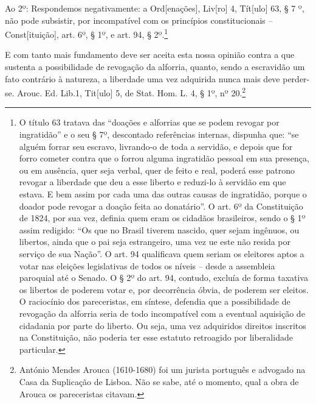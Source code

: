 Ao 2º: Respondemos negativamente: a Ord{[}enações{]}, Liv{[}ro{]} 4,
Tít{[}ulo{]} 63, § 7 º, não pode subsistir, por incompatível com os
princípios constitucionais -- Const{[}ituição{]}, art. 6º, § 1º, e art.
94, § 2º.\footnote{O título 63 tratava das ``doações e alforrias que se
  podem revogar por ingratidão'' e o seu § 7º, descontado referências
  internas, dispunha que: ``se alguém forrar seu escravo, livrando-o de
  toda a servidão, e depois que for forro cometer contra que o forrou
  alguma ingratidão pessoal em sua presença, ou em ausência, quer seja
  verbal, quer de feito e real, poderá esse patrono revogar a liberdade
  que deu a esse liberto e reduzi-lo à servidão em que estava. E bem
  assim por cada uma das outras causas de ingratidão, porque o doador
  pode revogar a doação feita ao donatário''. O art. 6º da Constituição
  de 1824, por sua vez, definia quem eram os cidadãos brasileiros, sendo
  o § 1º assim redigido: ``Os que no Brasil tiverem nascido, quer sejam
  ingênuos, ou libertos, ainda que o pai seja estrangeiro, uma vez ue
  este não resida por serviço de sua Nação''. O art. 94 qualificava quem
  seriam os eleitores aptos a votar nas eleições legislativas de todos
  os níveis -- desde a assembleia paroquial até o Senado. O § 2º do art.
  94, contudo, excluía de forma taxativa os libertos de poderem votar e,
  por decorrência óbvia, de poderem ser eleitos. O raciocínio dos
  pareceristas, em síntese, defendia que a possibilidade de revogação da
  alforria seria de todo incompatível com a eventual aquisição de
  cidadania por parte do liberto. Ou seja, uma vez adquiridos direitos
  inscritos na Constituição, não poderia ter esse estatuto retroagido
  por liberalidade particular.}

E com tanto mais fundamento deve ser aceita esta nossa opinião contra a
que sustenta a possibilidade de revogação da alforria, quanto, sendo a
escravidão um fato contrário à natureza, a liberdade uma vez adquirida
nunca mais deve perder-se. Arouc. Ed. Lib.1, Tit{[}ulo{]} 5, de Stat.
Hom. L. 4, § 1º, nº 20.\footnote{António Mendes Arouca (1610-1680) foi
  um jurista português e advogado na Casa da Suplicação de Lisboa. Não
  se sabe, até o momento, qual a obra de Arouca os pareceristas citavam.}

